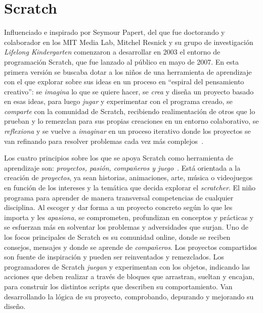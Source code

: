 \documentclass[a4paper, 12pt]{book}
\begin{document}
\section{Scratch}
\label{sec:scratch}

Influenciado e inspirado por Seymour Papert, del que fue doctorando y colaborador en los MIT Media Lab, Mitchel Resnick y su grupo de investigación \emph{Lifelong Kindergarten} comenzaron a desarrollar en 2003 el entorno de programación Scratch, que fue lanzado al público en mayo de 2007. En esta primera versión se buscaba dotar a los niños de una herramienta de aprendizaje con el que explorar sobre sus ideas en un proceso en ``espiral del pensamiento creativo'': se \emph{imagina} lo que se quiere hacer, se \emph{crea} y diseña un proyecto basado en esas ideas, para luego \emph{jugar} y experimentar con el programa creado, se \emph{comparte} con la comunidad de Scratch, recibiendo realimentación de otros que lo prueban y lo remezclan para sus propias creaciones en un entorno colaborativo, se \emph{reflexiona} y se vuelve a \emph{imaginar} en un proceso iterativo donde los proyectos se van refinando para resolver problemas cada vez más complejos~\cite{resnick2007all, resnick2008sowing}. 

Los cuatro principios sobre los que se apoya Scratch como herramienta de aprendizaje son: \textit{proyectos, pasión, compañeros y juego}~\cite{resnick2017seeds}. Está orientada a la creación de \emph{proyectos}, ya sean historias, animaciones, arte, música o videojuegos en función de los intereses y la temática que decida explorar el \emph{scratcher}. El niño programa para aprender de manera transversal competencias de cualquier disciplina. Al escoger y dar forma a un proyecto concreto según lo que les importa y les \emph{apasiona}, se comprometen, profundizan en conceptos y prácticas y se esfuerzan más en solventar los problemas y adversidades que surjan. Uno de los focos principales de Scratch es su comunidad online, donde se reciben consejos, mensajes y donde se aprende de \emph{compañeros}. Los proyectos compartidos son fuente de inspiración y pueden ser reinventados y remezclados. Los programadores de Scratch \emph{juegan} y experimentan con los objetos, indicando las acciones que deben realizar a través de bloques que arrastran, sueltan y encajan, para construir los distintos scripts que describen su comportamiento.%
Van desarrollando la lógica de su proyecto, comprobando, depurando y mejorando su diseño.
\end{document}
